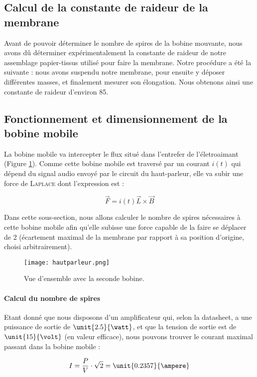 \subsection{Calcul de la constante de raideur de la membrane}
Avant de pouvoir déterminer le nombre de spires de la bobine mouvante, nous avons dû déterminer
expérimentalement la constante de raideur de notre assemblage papier-tissus utilisé pour faire la membrane.
Notre procédure a été la suivante : nous avons suspendu notre membrane, pour ensuite 
y déposer différentes masses, et finalement mesurer son élongation.
Nous obtenons ainsi une constante de raideur d'environ \unit{85}{\newton\per\meter}.

\subsection{Fonctionnement et dimensionnement de la bobine mobile}
La bobine mobile va intercepter le flux situé dans l'entrefer de l'életroaimant (Figure 
\ref{overview_mobile_coil}).
Comme cette bobine mobile est traversé par un courant $i(t)$ qui dépend du signal
audio envoyé par le circuit du haut-parleur, elle va subir une force de \textsc{Laplace}
dont l'expression est :

$$\vec{F} = i(t)\vec{L}\times{\vec{B}}$$ 

Dans cette sous-section, nous allons calculer le nombre de spires nécessaires
à cette bobine mobile afin qu'elle subisse une force capable de la faire
se déplacer de \unit{2}{\milli\meter} (écartement maximal de la membrane 
par rapport à sa position d'origine, choisi arbitrairement).

\begin{figure}[ht!]
\centering
\texttt{[image: hautparleur.png]}
\caption{Vue d'ensemble avec la seconde bobine.}
\label{overview_mobile_coil}
\end{figure}

\paragraph{Calcul du nombre de spires}
Etant donné que nous disposons d'un amplificateur qui, selon la datasheet\cite{datasheetampli}, a une puissance de sortie de 
$\unit{2.5}{\watt}$, et que la tension de sortie est de $\unit{15}{\volt}$ (en valeur efficace), nous pouvons trouver le courant
maximal passant dans la bobine mobile :

$$I = \frac{P}{V} \cdot{\sqrt{2}} = \unit{0.2357}{\ampere}$$


